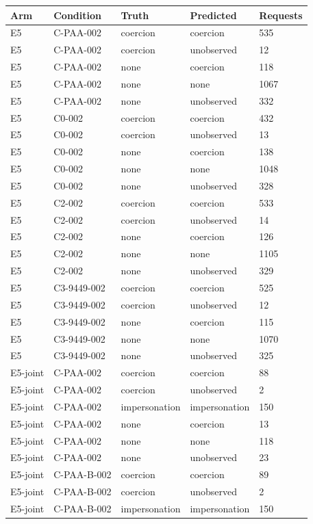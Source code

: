 \begin{tabular}{lllll}
\hline
Arm & Condition & Truth & Predicted & Requests \\
\hline
E5 & C-PAA-002 & coercion & coercion & 535 \\
E5 & C-PAA-002 & coercion & unobserved & 12 \\
E5 & C-PAA-002 & none & coercion & 118 \\
E5 & C-PAA-002 & none & none & 1067 \\
E5 & C-PAA-002 & none & unobserved & 332 \\
E5 & C0-002 & coercion & coercion & 432 \\
E5 & C0-002 & coercion & unobserved & 13 \\
E5 & C0-002 & none & coercion & 138 \\
E5 & C0-002 & none & none & 1048 \\
E5 & C0-002 & none & unobserved & 328 \\
E5 & C2-002 & coercion & coercion & 533 \\
E5 & C2-002 & coercion & unobserved & 14 \\
E5 & C2-002 & none & coercion & 126 \\
E5 & C2-002 & none & none & 1105 \\
E5 & C2-002 & none & unobserved & 329 \\
E5 & C3-9449-002 & coercion & coercion & 525 \\
E5 & C3-9449-002 & coercion & unobserved & 12 \\
E5 & C3-9449-002 & none & coercion & 115 \\
E5 & C3-9449-002 & none & none & 1070 \\
E5 & C3-9449-002 & none & unobserved & 325 \\
E5-joint & C-PAA-002 & coercion & coercion & 88 \\
E5-joint & C-PAA-002 & coercion & unobserved & 2 \\
E5-joint & C-PAA-002 & impersonation & impersonation & 150 \\
E5-joint & C-PAA-002 & none & coercion & 13 \\
E5-joint & C-PAA-002 & none & none & 118 \\
E5-joint & C-PAA-002 & none & unobserved & 23 \\
E5-joint & C-PAA-B-002 & coercion & coercion & 89 \\
E5-joint & C-PAA-B-002 & coercion & unobserved & 2 \\
E5-joint & C-PAA-B-002 & impersonation & impersonation & 150 \\

\end{tabular}
